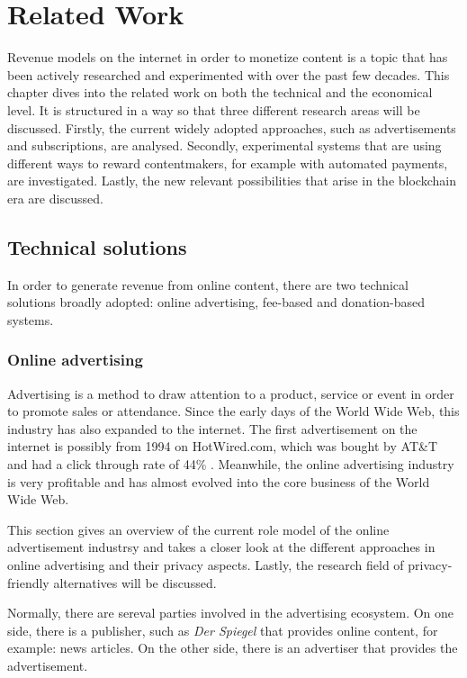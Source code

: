 \chapter{Related Work}
\label{cha:relatedwork}

Revenue models on the internet in order to monetize content is a topic that has been actively researched and experimented with over the past few decades. This chapter dives into the related work on both the technical and the economical level. It is structured in a way so that three different research areas will be discussed.
Firstly, the current widely adopted approaches, such as advertisements and subscriptions, are analysed. Secondly, experimental systems that are using different ways to reward contentmakers, for example with automated payments, are investigated. Lastly, the new relevant possibilities that arise in the blockchain era are discussed.


\section{Technical solutions}

In order to generate revenue from online content, there are two technical solutions broadly adopted: online advertising, fee-based and donation-based systems.

\subsection{Online advertising}
Advertising is a method to draw attention to a product, service or event in order to promote sales or attendance. Since the early days of the World Wide Web, this industry has also expanded to the internet. The first advertisement on the internet is possibly from 1994 on HotWired.com, which was bought by AT\&T and had a click through rate of 44\% \cite{firstbanner}. Meanwhile, the online advertising industry is very profitable and has almost evolved into the core business of the World Wide Web.

This section gives an overview of the current role model of the online advertisement industrsy and takes a closer look at the different approaches in online advertising and their privacy aspects. Lastly, the research field of privacy-friendly alternatives will be discussed. 

Normally, there are sereval parties involved in the advertising ecosystem. On one side, there is a publisher, such as \textit{Der Spiegel} that provides online content, for example: news articles. On the other side, there is an advertiser that provides the advertisement.

